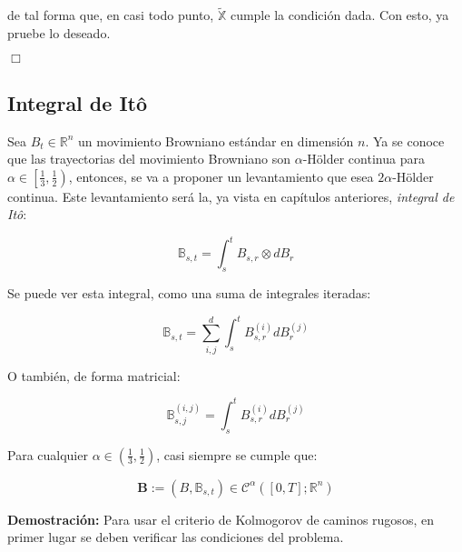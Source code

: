  	de tal forma que, en casi todo punto, $\tilde{\mathbb{X}}$ cumple la condición dada. Con esto, ya pruebe lo deseado.


\begin{flushright}
	$\Box$
\end{flushright}


\subsection{Integral de Itô}

Sea $B_t \in \mathbb{R}^n$ un movimiento Browniano estándar en dimensión $n$. Ya se conoce que las trayectorias del movimiento Browniano son $\alpha$-Hölder continua para $\alpha \in \left[ \frac{1}{3}, \frac{1}{2} \right)$, entonces, se va a proponer un levantamiento que esea $2\alpha$-Hölder continua. Este levantamiento será la, ya vista en capítulos anteriores, \textit{integral de Itô}:

\[
	\mathbb{B}_{s,t} = \int_s^t B_{s,r} \otimes dB_r
\]

Se puede ver esta integral, como una suma de integrales iteradas:

\[
	\mathbb{B}_{s,t} = \sum_{i,j}^d \int_s^t	 B_{s,r}^{(i)} dB_r^{(j)}
\]

O también, de forma matricial:

\[
	\mathbb{B}_{s,j}^{(i,j)} = \int_s^t	 B_{s,r}^{(i)} dB_r^{(j)}	
\]

\begin{prop}
	Para cualquier $\alpha \in \left( \frac{1}{3}, \frac{1}{2} \right)$, casi siempre se cumple que:

	\[
		\mathbf{B} := (B, \mathbb{B}_{s,t}) \in \mathcal{C}^{\alpha}([0,T]; \mathbb{R}^n)
	\]
\end{prop}

\textbf{Demostración:} Para usar el criterio de Kolmogorov de caminos rugosos, en primer lugar se deben verificar las condiciones del problema.

